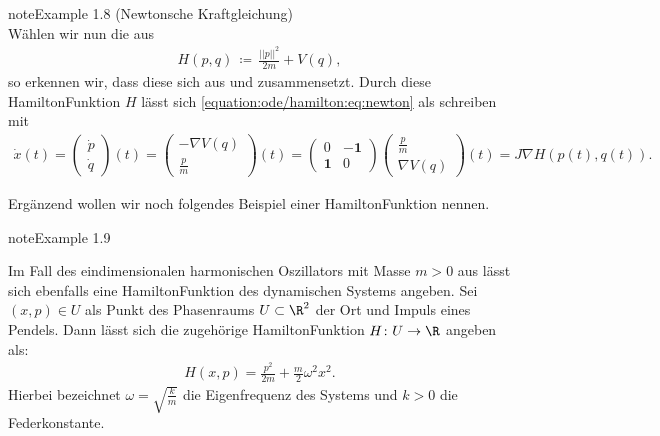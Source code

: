 \documentclass[letterpaper,10pt,english]{jupyterBook}
\begin{document}
\begin{sphinxadmonition}{note}{Example 1.8 (Newtonsche Kraftgleichung)}
\begin{equation}
\end{equation}
\sphinxAtStartPar
Wählen wir nun die  aus {\hyperref[\detokenize{ode/hamilton:def:hamiltonsch}]{}}
\begin{equation*}
\begin{split}H(p,q) \, \coloneqq \, \frac{||p||^2}{2m} + V(q),\end{split}
\end{equation*}
\sphinxAtStartPar
so erkennen wir, dass diese sich aus  und  zusammensetzt.
Durch diese Hamilton\sphinxhyphen{}Funktion \(H\) lässt sich \eqref{equation:ode/hamilton:eq:newton} als  schreiben mit
\begin{equation*}
\begin{split}\dot{x}(t) = \begin{pmatrix}\dot{p} \\ \dot{q} \end{pmatrix}(t) = \begin{pmatrix} -\nabla V(q) \\ \frac{p}{m} \end{pmatrix}(t) = \begin{pmatrix}0 & -\mathbf{1}\\ \mathbf{1} & 0 \end{pmatrix} \begin{pmatrix} \frac{p}{m} \\ \nabla V(q) \end{pmatrix}(t) = J \nabla H(p(t),q(t)).\end{split}
\end{equation*}\end{sphinxadmonition}

\sphinxAtStartPar
Ergänzend wollen wir noch folgendes Beispiel einer Hamilton\sphinxhyphen{}Funktion nennen.
\label{ode/hamilton:example-4}
\begin{sphinxadmonition}{note}{Example 1.9}



\sphinxAtStartPar
Im Fall des eindimensionalen harmonischen Oszillators mit Masse \(m > 0\) aus {\hyperref[\detokenize{ode/fluesse:ex:oscillations}]{}} lässt sich ebenfalls eine Hamilton\sphinxhyphen{}Funktion des dynamischen Systems angeben.
Sei \((x,p) \in U\) als Punkt des Phasenraums \(U \subset \R^2\) der Ort und Impuls eines Pendels.
Dann lässt sich die zugehörige Hamilton\sphinxhyphen{}Funktion \(H \colon U \rightarrow \R\) angeben als:
\begin{equation*}
\begin{split}H(x,p) = \frac{p^2}{2m} + \frac{m}{2} \omega^2 x^2.\end{split}
\end{equation*}
\sphinxAtStartPar
Hierbei bezeichnet \(\omega = \sqrt{\frac{k}{m}}\) die Eigenfrequenz des Systems und \(k > 0\) die Federkonstante.
\end{sphinxadmonition}
\end{document}

